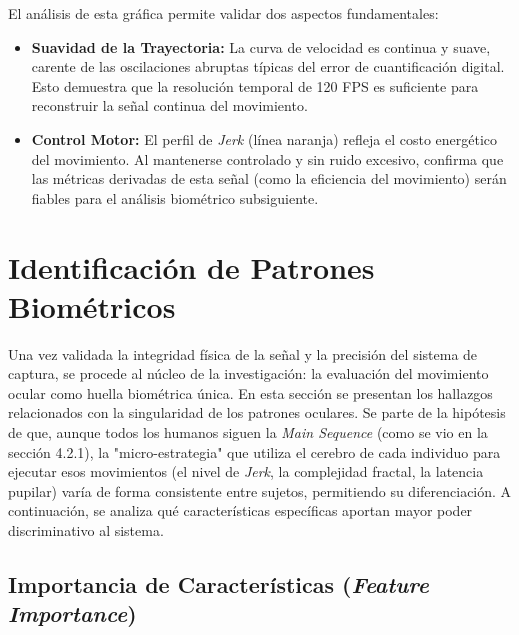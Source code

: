 El análisis de esta gráfica permite validar dos aspectos fundamentales:
\begin{itemize}
	\item \textbf{Suavidad de la Trayectoria:} La curva de velocidad es continua y suave, carente de las oscilaciones abruptas típicas del error de cuantificación digital.
	Esto demuestra que la resolución temporal de 120 FPS es suficiente para reconstruir la señal continua del movimiento.
	\item \textbf{Control Motor:} El perfil de \textit{Jerk} (línea naranja) refleja el costo energético del movimiento.
	Al mantenerse controlado y sin ruido excesivo, confirma que las métricas derivadas de esta señal (como la eficiencia del movimiento) serán fiables para el análisis biométrico subsiguiente.
\end{itemize}

\section{Identificación de Patrones Biométricos}

Una vez validada la integridad física de la señal y la precisión del sistema de captura, se procede al núcleo de la investigación: la evaluación del movimiento ocular como huella biométrica única.
En esta sección se presentan los hallazgos relacionados con la singularidad de los patrones oculares.
Se parte de la hipótesis de que, aunque todos los humanos siguen la \textit{Main Sequence} (como se vio en la sección 4.2.1), la "micro-estrategia" que utiliza el cerebro de cada individuo para ejecutar esos movimientos (el nivel de \textit{Jerk}, la complejidad fractal, la latencia pupilar) varía de forma consistente entre sujetos, permitiendo su diferenciación.
A continuación, se analiza qué características específicas aportan mayor poder discriminativo al sistema.

\subsection{Importancia de Características (\textit{Feature Importance})}

